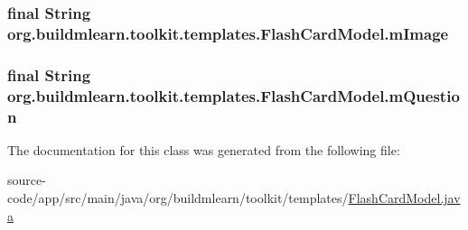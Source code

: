 \subsubsection[{\texorpdfstring{m\+Image}{mImage}}]{\setlength{\rightskip}{0pt plus 5cm}final String org.\+buildmlearn.\+toolkit.\+templates.\+Flash\+Card\+Model.\+m\+Image\hspace{0.3cm}{\ttfamily [private]}}\hypertarget{classorg_1_1buildmlearn_1_1toolkit_1_1templates_1_1FlashCardModel_a3df0201957fbfedf079fcf2cbda83e87}{}\label{classorg_1_1buildmlearn_1_1toolkit_1_1templates_1_1FlashCardModel_a3df0201957fbfedf079fcf2cbda83e87}
\subsubsection[{\texorpdfstring{m\+Question}{mQuestion}}]{\setlength{\rightskip}{0pt plus 5cm}final String org.\+buildmlearn.\+toolkit.\+templates.\+Flash\+Card\+Model.\+m\+Question\hspace{0.3cm}{\ttfamily [private]}}\hypertarget{classorg_1_1buildmlearn_1_1toolkit_1_1templates_1_1FlashCardModel_a0c75cd9e4ab66ec72e7f7188f55012a5}{}\label{classorg_1_1buildmlearn_1_1toolkit_1_1templates_1_1FlashCardModel_a0c75cd9e4ab66ec72e7f7188f55012a5}


The documentation for this class was generated from the following file\+:\begin{DoxyCompactItemize}
\item 
source-\/code/app/src/main/java/org/buildmlearn/toolkit/templates/\hyperlink{FlashCardModel_8java}{Flash\+Card\+Model.\+java}\end{DoxyCompactItemize}
